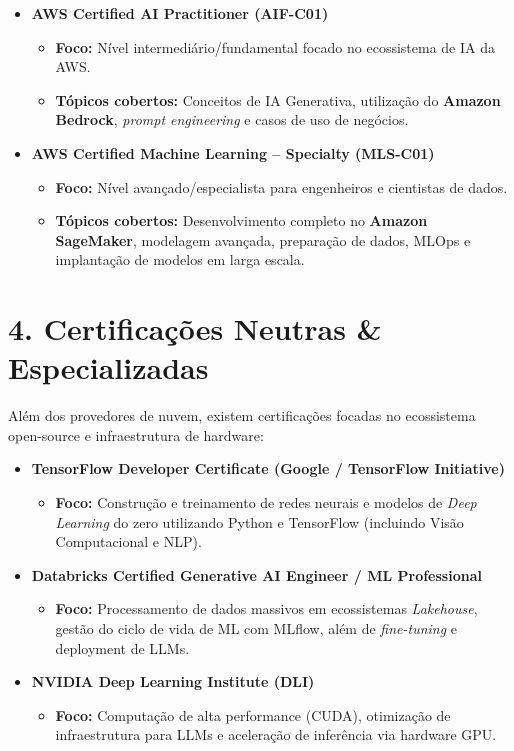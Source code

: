 \documentclass[11pt, a4paper]{article}
\begin{document}
\begin{itemize}
    \item \textbf{AWS Certified AI Practitioner (AIF-C01)}
    \begin{itemize}
        \item \textbf{Foco:} Nível intermediário/fundamental focado no ecossistema de IA da AWS.
        \item \textbf{Tópicos cobertos:} Conceitos de IA Generativa, utilização do \textbf{Amazon Bedrock}, \textit{prompt engineering} e casos de uso de negócios.
    \end{itemize}

    \item \textbf{AWS Certified Machine Learning -- Specialty (MLS-C01)}
    \begin{itemize}
        \item \textbf{Foco:} Nível avançado/especialista para engenheiros e cientistas de dados.
        \item \textbf{Tópicos cobertos:} Desenvolvimento completo no \textbf{Amazon SageMaker}, modelagem avançada, preparação de dados, MLOps e implantação de modelos em larga escala.
    \end{itemize}
\end{itemize}

\vspace{1em}

\section*{\color{primary}4. Certificações Neutras \& Especializadas}
Além dos provedores de nuvem, existem certificações focadas no ecossistema open-source e infraestrutura de hardware:

\begin{itemize}
    \item \textbf{TensorFlow Developer Certificate (Google / TensorFlow Initiative)}
    \begin{itemize}
        \item \textbf{Foco:} Construção e treinamento de redes neurais e modelos de \textit{Deep Learning} do zero utilizando Python e TensorFlow (incluindo Visão Computacional e NLP).
    \end{itemize}

    \item \textbf{Databricks Certified Generative AI Engineer / ML Professional}
    \begin{itemize}
        \item \textbf{Foco:} Processamento de dados massivos em ecossistemas \textit{Lakehouse}, gestão do ciclo de vida de ML com MLflow, além de \textit{fine-tuning} e deployment de LLMs.
    \end{itemize}

    \item \textbf{NVIDIA Deep Learning Institute (DLI)}
    \begin{itemize}
        \item \textbf{Foco:} Computação de alta performance (CUDA), otimização de infraestrutura para LLMs e aceleração de inferência via hardware GPU.
    \end{itemize}
\end{itemize}
\end{document}
